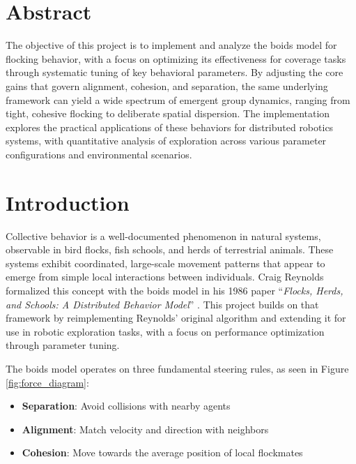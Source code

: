 \documentclass[12pt]{article}
\begin{document}
\begin{linenumbers}
\setlength{\parindent}{0pt}
\setlength{\parskip}{0.5em}
\section*{Abstract}

The objective of this project is to implement and analyze the boids model for flocking behavior, with a focus on optimizing its effectiveness for coverage tasks through systematic tuning of key behavioral parameters. By adjusting the core gains that govern alignment, cohesion, and separation, the same underlying framework can yield a wide spectrum of emergent group dynamics, ranging from tight, cohesive flocking to deliberate spatial dispersion. The implementation explores the practical applications of these behaviors for distributed robotics systems, with quantitative analysis of exploration across various parameter configurations and environmental scenarios.

\newpage

\section{Introduction}

Collective behavior is a well-documented phenomenon in natural systems, observable in bird flocks, fish schools, and herds of terrestrial animals. These systems exhibit coordinated, large-scale movement patterns that appear to emerge from simple local interactions between individuals. Craig Reynolds formalized this concept with the boids model in his 1986 paper ``\emph{Flocks, Herds, and Schools: A Distributed Behavior Model}'' \cite{reynolds1987flocks}. This project builds on that framework by reimplementing Reynolds' original algorithm and extending it for use in robotic exploration tasks, with a focus on performance optimization through parameter tuning.

The boids model operates on three fundamental steering rules, as seen in Figure \ref{fig:force_diagram}:
\begin{itemize}[nosep]
    \item \textbf{Separation}: Avoid collisions with nearby agents
    \item \textbf{Alignment}: Match velocity and direction with neighbors
    \item \textbf{Cohesion}: Move towards the average position of local flockmates
\end{itemize}


\end{linenumbers}
\end{document}
